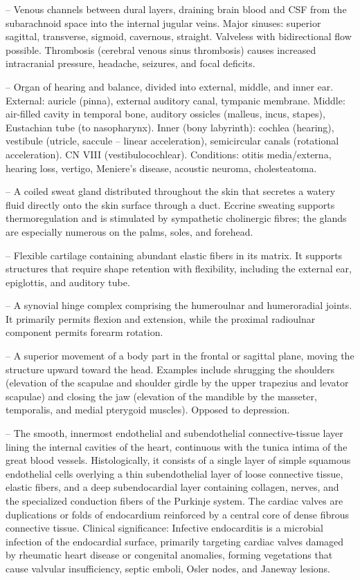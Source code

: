 -- Venous channels between dural layers, draining brain blood and CSF from the subarachnoid space into the internal jugular veins. Major sinuses: superior sagittal, transverse, sigmoid, cavernous, straight. Valveless with bidirectional flow possible. Thrombosis (cerebral venous sinus thrombosis) causes increased intracranial pressure, headache, seizures, and focal deficits.

-- Organ of hearing and balance, divided into external, middle, and inner ear. External: auricle (pinna), external auditory canal, tympanic membrane. Middle: air-filled cavity in temporal bone, auditory ossicles (malleus, incus, stapes), Eustachian tube (to nasopharynx). Inner (bony labyrinth): cochlea (hearing), vestibule (utricle, saccule -- linear acceleration), semicircular canals (rotational acceleration). CN VIII (vestibulocochlear). Conditions: otitis media/externa, hearing loss, vertigo, Meniere's disease, acoustic neuroma, cholesteatoma.

-- A coiled sweat gland distributed throughout the skin that secretes a watery fluid directly onto the skin surface through a duct. Eccrine sweating supports thermoregulation and is stimulated by sympathetic cholinergic fibres; the glands are especially numerous on the palms, soles, and forehead.

-- Flexible cartilage containing abundant elastic fibers in its matrix. It supports structures that require shape retention with flexibility, including the external ear, epiglottis, and auditory tube.

-- A synovial hinge complex comprising the humeroulnar and humeroradial joints. It primarily permits flexion and extension, while the proximal radioulnar component permits forearm rotation.

-- A superior movement of a body part in the frontal or sagittal plane, moving the structure upward toward the head. Examples include shrugging the shoulders (elevation of the scapulae and shoulder girdle by the upper trapezius and levator scapulae) and closing the jaw (elevation of the mandible by the masseter, temporalis, and medial pterygoid muscles). Opposed to depression.

-- The smooth, innermost endothelial and subendothelial connective-tissue layer lining the internal cavities of the heart, continuous with the tunica intima of the great blood vessels. Histologically, it consists of a single layer of simple squamous endothelial cells overlying a thin subendothelial layer of loose connective tissue, elastic fibers, and a deep subendocardial layer containing collagen, nerves, and the specialized conduction fibers of the Purkinje system. The cardiac valves are duplications or folds of endocardium reinforced by a central core of dense fibrous connective tissue. Clinical significance: Infective endocarditis is a microbial infection of the endocardial surface, primarily targeting cardiac valves damaged by rheumatic heart disease or congenital anomalies, forming vegetations that cause valvular insufficiency, septic emboli, Osler nodes, and Janeway lesions.

